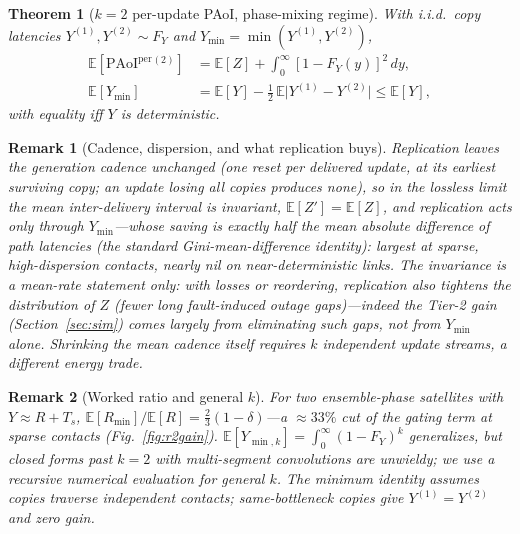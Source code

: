 \documentclass[twocolumn,3p,times,procedia]{elsarticle}
\newtheorem{theorem}{Theorem}
\newtheorem{remark}{Remark}
\newcommand{\PAoIper}{\mathrm{PAoI}^{\mathrm{per}}}
\newcommand{\E}{\mathbb{E}}
\newcommand{\Rmin}{R_{\min}}
\newcommand{\Ymin}{Y_{\min}}
\begin{document}
\begin{theorem}[$k{=}2$ per-update PAoI, phase-mixing regime]\label{thm:r2}
With i.i.d.\ copy latencies $Y^{(1)},Y^{(2)}\sim F_Y$ and
$\Ymin=\min(Y^{(1)},Y^{(2)})$,
\begin{align}
\E[\PAoIper{}^{(2)}]&=\E[Z]+\int_0^\infty[1-F_Y(y)]^2\,dy,\\
\E[\Ymin]&=\E[Y]-\tfrac12\,\E\bigl|Y^{(1)}-Y^{(2)}\bigr|\le\E[Y],
\end{align}
with equality iff $Y$ is deterministic.
\end{theorem}

\begin{remark}[Cadence, dispersion, and what replication buys]
Replication leaves the \emph{generation} cadence unchanged (one reset
per \emph{delivered} update, at its earliest surviving copy; an update
losing all copies produces none), so in the lossless limit
the mean inter-delivery interval is invariant, $\E[Z']{=}\E[Z]$, and
replication acts only through $\Ymin$---whose saving is exactly half
the mean absolute difference of path latencies (the standard
Gini-mean-difference identity): largest at sparse, high-dispersion
contacts, nearly nil on near-deterministic links. The invariance is a
mean-rate statement only: with losses or reordering, replication also
\emph{tightens the distribution} of $Z$ (fewer long fault-induced
outage gaps)---indeed the Tier-2 gain (Section~\ref{sec:sim}) comes
largely from eliminating such gaps, not from $\Ymin$ alone. Shrinking
the mean cadence itself requires $k$ independent update streams, a
different energy trade.
\end{remark}

\begin{remark}[Worked ratio and general $k$]
For two ensemble-phase satellites with $Y\approx R+T_s$,
$\E[\Rmin]/\E[R]=\tfrac23(1-\delta)$---a ${\approx}33\%$ cut of the
gating term at sparse contacts (Fig.~\ref{fig:r2gain}).
$\E[Y_{\min,k}]=\int_0^\infty(1-F_Y)^k$ generalizes, but closed forms
past $k{=}2$ with multi-segment convolutions are unwieldy; we use a
recursive numerical evaluation for general $k$. The minimum identity
assumes copies traverse \emph{independent} contacts; same-bottleneck
copies give $Y^{(1)}{=}Y^{(2)}$ and zero gain.
\end{remark}

\end{document}

